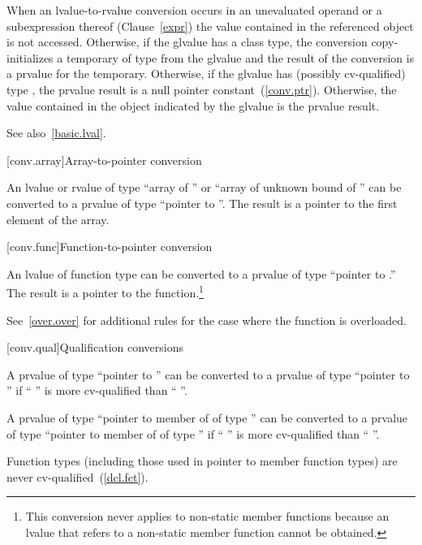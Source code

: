 \pnum
When an lvalue-to-rvalue conversion occurs in an unevaluated operand or
a subexpression thereof (Clause~\ref{expr}) the value contained in the
referenced object is not accessed. Otherwise, if the glvalue has a class
type, the conversion copy-initializes a temporary of type  from
the glvalue and the result of the conversion is a prvalue for the
temporary.
Otherwise, if the glvalue has (possibly cv-qualified) type , the prvalue result is a null pointer constant~(\ref{conv.ptr}).
Otherwise, the value contained in the object indicated by the
glvalue is the prvalue result.

\pnum
\enternote 
See also~\ref{basic.lval}.\exitnote 

[conv.array]{Array-to-pointer conversion}

\pnum
{}%
%
An lvalue or rvalue of type ``array of  '' or ``array
of unknown bound of '' can be converted to a prvalue of type
``pointer to ''. The result is a pointer to the first element
of the array.

[conv.func]{Function-to-pointer conversion}

\pnum
{}%
An lvalue of function type  can be converted to a prvalue of
type ``pointer to .'' The result is a pointer to the
function.\footnote{This conversion never applies to non-static member functions because an
lvalue that refers to a non-static member function cannot be obtained.}

\pnum
\enternote 
See~\ref{over.over} for additional rules for the case where the function
is overloaded.
\exitnote 

[conv.qual]{Qualification conversions}

\pnum
{}%
A prvalue of type ``pointer to  '' can be
converted to a prvalue of type ``pointer to  '' if
`` '' is more cv-qualified than ``
''.

\pnum
A prvalue of type ``pointer to member of  of type 
'' can be converted to a prvalue of type ``pointer to member
of  of type  '' if ``
'' is more cv-qualified than `` ''.

\pnum
\enternote 
Function types (including those used in pointer to member function
types) are never cv-qualified~(\ref{dcl.fct}).
\exitnote 

